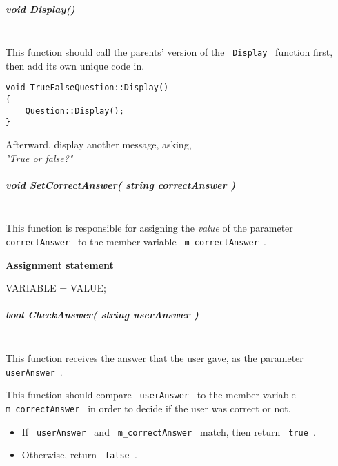 \documentclass[a4paper,12pt]{book}
\begin{document}
                        \subparagraph{ void Display() } ~\\

                            This function should call the parents' version of
                            the \texttt{ Display } function first, then add
                            its own unique code in.
                            
\begin{lstlisting}[style=code]
void TrueFalseQuestion::Display()
{
    Question::Display();
}
\end{lstlisting}
                            Afterward, display another message, asking, \\
                            \textit{ "True or false?" }

                        \newpage
                        \subparagraph{ void SetCorrectAnswer( string correctAnswer ) }  ~\\

                            This function is responsible for assigning the \textit{ value }
                            of the parameter \texttt{ correctAnswer } to the member variable
                            \texttt{ m\_correctAnswer }.

                            \begin{mdframed}[backgroundcolor=hint] 
                            \textbf{ Assignment statement }

                            VARIABLE = VALUE;
                            \end{mdframed}

                        \subparagraph{ bool CheckAnswer( string userAnswer ) } ~\\

                            This function receives the answer that the user gave,
                            as the parameter \texttt{ userAnswer }.

                            This function should compare \texttt{ userAnswer } to
                            the member variable \texttt{ m\_correctAnswer } in order
                            to decide if the user was correct or not.

                            \begin{itemize}
                                \item If \texttt{ userAnswer } and \texttt{ m\_correctAnswer } match, then return \texttt{ true }.
                                \item Otherwise, return \texttt{ false }.
                            \end{itemize}
                        
\end{document}
